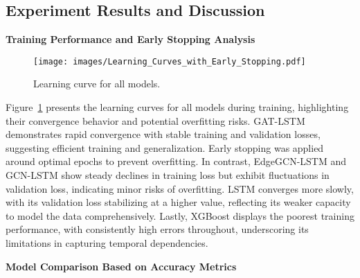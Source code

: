 \documentclass[sigconf,nonacm]{acmart}
\begin{document}
\subsection{Experiment Results and Discussion}

\textbf{Training Performance and Early Stopping Analysis}

\begin{figure}[h!]
    \centering
    \texttt{[image: images/Learning\_Curves\_with\_Early\_Stopping.pdf]} 
    \caption{Learning curve for all models.}
    \label{fig:learning_curves}
\end{figure}

Figure~\ref{fig:learning_curves} presents the learning curves for all models during training, highlighting their convergence behavior and potential overfitting risks. GAT-LSTM demonstrates rapid convergence with stable training and validation losses, suggesting efficient training and generalization. Early stopping was applied around optimal epochs to prevent overfitting. In contrast, EdgeGCN-LSTM and GCN-LSTM show steady declines in training loss but exhibit fluctuations in validation loss, indicating minor risks of overfitting. LSTM converges more slowly, with its validation loss stabilizing at a higher value, reflecting its weaker capacity to model the data comprehensively. Lastly, XGBoost displays the poorest training performance, with consistently high errors throughout, underscoring its limitations in capturing temporal dependencies.

\textbf{Model Comparison Based on Accuracy Metrics}

\begin{table}[h!]
  \caption{Experiment Results}
  \label{tab:experiment_results}
  \centering
\end{table}
\end{document}
